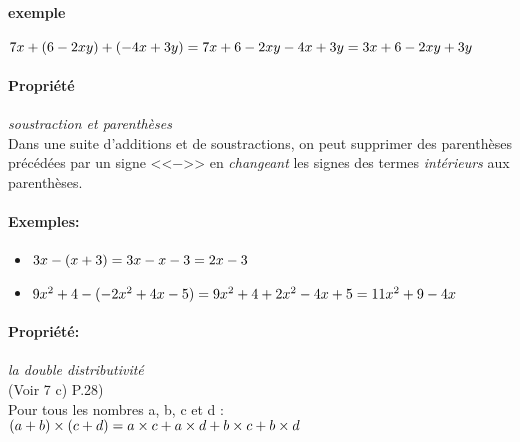 \documentclass[
	a4paper,
	twocolumn=false,
	12pts,
	DIV=calc]%
	{article}
\begin{document}
\paragraph{exemple} 
\begin{math}
7x + (6-2xy)+(-4x+3y)\\
= 7x+6-2xy-4x+3y\\
= 3x+6-2xy+3y
\end{math}

\paragraph{Propriété}\emph{soustraction et parenthèses}\\
Dans une suite d'additions et de soustractions, on peut supprimer des parenthèses précédées par un signe <<$-$>> en \emph{changeant} les signes des termes \emph{intérieurs} aux parenthèses.

\paragraph{Exemples:}
\begin{itemize}
	\item
		\begin{math}
		3x-(x+3) \\
		= 3x-x-3 \\
		= 2x-3
		\end{math}
	\item
		\begin{math}
		9x^2+4-(-2x^2+4x-5) \\
		= 9x^2+4+2x^2-4x+5 \\
		= 11x^2+9-4x
		\end{math}
\end{itemize}

\paragraph{Propriété:}\emph{la double distributivité}\\
(Voir 7 c) P.28)\\
Pour tous les nombres a, b, c et d :
	\begin{math}
	(a+b) \times (c+d) \\
	= a \times c + a \times d + b\times c + b\times d
	\end{math}
\end{document}
